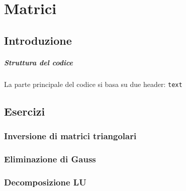 \setchapterpreamble[u]{\margintoc}
\chapter{Matrici}

\section{Introduzione}

\paragraph{Struttura del codice}

La parte principale del codice si basa su due header: \texttt{text}

\section{Esercizi}

\subsection{Inversione di matrici triangolari}

\subsection{Eliminazione di Gauss}

\subsection{Decomposizione LU}

